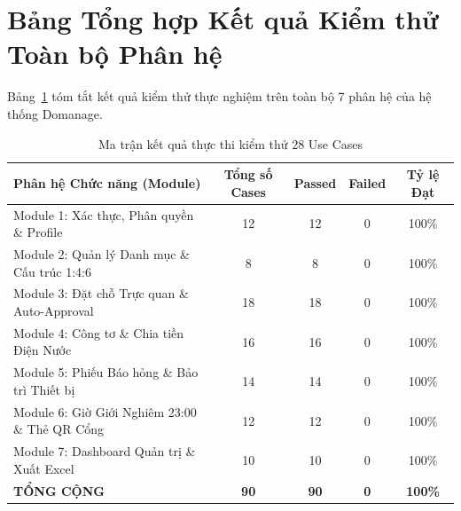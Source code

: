 \section{Bảng Tổng hợp Kết quả Kiểm thử Toàn bộ Phân hệ}
Bảng~\ref{tab:test_execution_matrix} tóm tắt kết quả kiểm thử thực nghiệm trên toàn bộ 7 phân hệ của hệ thống Domanage.

\begin{table}[htbp]
\centering
\caption{Ma trận kết quả thực thi kiểm thử 28 Use Cases}
\label{tab:test_execution_matrix}
\small
\begin{tabularx}{\textwidth}{|l|c|c|c|c|}
\hline
\rowcolor{blue!10}
\textbf{Phân hệ Chức năng (Module)} & \textbf{Tổng số Cases} & \textbf{Passed} & \textbf{Failed} & \textbf{Tỷ lệ Đạt} \\ \hline
Module 1: Xác thực, Phân quyền \& Profile & 12 & 12 & 0 & 100\% \\ \hline
Module 2: Quản lý Danh mục \& Cấu trúc 1:4:6 & 8 & 8 & 0 & 100\% \\ \hline
Module 3: Đặt chỗ Trực quan \& Auto-Approval & 18 & 18 & 0 & 100\% \\ \hline
Module 4: Công tơ \& Chia tiền Điện Nước & 16 & 16 & 0 & 100\% \\ \hline
Module 5: Phiếu Báo hỏng \& Bảo trì Thiết bị & 14 & 14 & 0 & 100\% \\ \hline
Module 6: Giờ Giới Nghiêm 23:00 \& Thẻ QR Cổng & 12 & 12 & 0 & 100\% \\ \hline
Module 7: Dashboard Quản trị \& Xuất Excel & 10 & 10 & 0 & 100\% \\ \hline
\rowcolor{green!10}
\textbf{TỔNG CỘNG} & \textbf{90} & \textbf{90} & \textbf{0} & \textbf{100\%} \\ \hline
\end{tabularx}
\end{table}

